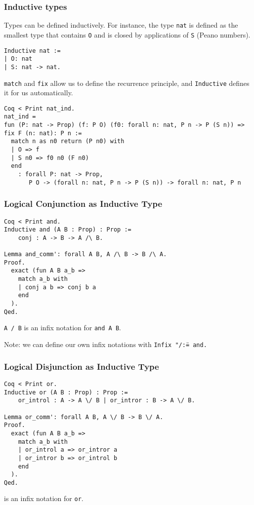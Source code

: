 \documentclass{beamer}
\begin{document}
\begin{frame}[fragile]
  \frametitle{Inductive types}

Types can be defined inductively. For instance, the type \texttt{nat}
is defined as the smallest type that contains \texttt{O} and is closed
by applications of \texttt{S} (Peano numbers).
\vfill
\begin{verbatim}
Inductive nat :=
| O: nat
| S: nat -> nat.
\end{verbatim}
\vfill
\texttt{match} and \texttt{fix} allow us to define the recurrence
principle, and \texttt{Inductive} defines it for us automatically.
\footnotesize
\begin{verbatim}
Coq < Print nat_ind.
nat_ind =
fun (P: nat -> Prop) (f: P O) (f0: forall n: nat, P n -> P (S n)) =>
fix F (n: nat): P n :=
  match n as n0 return (P n0) with
  | O => f
  | S n0 => f0 n0 (F n0)
  end
    : forall P: nat -> Prop,
       P O -> (forall n: nat, P n -> P (S n)) -> forall n: nat, P n
\end{verbatim}
\end{frame}
\begin{frame}[fragile]
  \frametitle{Logical Conjunction as Inductive Type}

\begin{verbatim}
Coq < Print and.
Inductive and (A B : Prop) : Prop :=
    conj : A -> B -> A /\ B.

Lemma and_comm': forall A B, A /\ B -> B /\ A.
Proof.
  exact (fun A B a_b =>
    match a_b with
    | conj a b => conj b a
    end
  ).
Qed.
\end{verbatim}

\vfill

\texttt{A /\ B} is an infix notation for \texttt{and A B}.

\vfill

Note: we can define our own infix notations with \texttt{Infix "/\" := and.}
\end{frame}
\begin{frame}[fragile]
  \frametitle{Logical Disjunction as Inductive Type}

\begin{verbatim}
Coq < Print or.
Inductive or (A B : Prop) : Prop :=
    or_introl : A -> A \/ B | or_intror : B -> A \/ B.

Lemma or_comm': forall A B, A \/ B -> B \/ A.
Proof.
  exact (fun A B a_b =>
    match a_b with
    | or_introl a => or_intror a
    | or_intror b => or_introl b
    end
  ).
Qed.
\end{verbatim}

\vfill

\texttt{\/} is an infix notation for \texttt{or}.

\end{frame}
\end{document}
